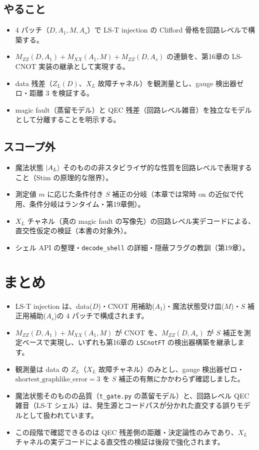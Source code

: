 \subsection{やること}

\begin{itemize}
  \item 4 パッチ（$D,A_1,M,A_s$）で LS-T injection の Clifford 骨格を回路レベルで構築する。
  \item $M_{ZZ}(D,A_1)+M_{XX}(A_1,M)+M_{ZZ}(D,A_s)$ の連鎖を、第16章の LS-CNOT 実装の継承として実現する。
  \item data 残差（$Z_L(D)$、$X_L$ 故障チャネル）を観測量とし、gauge 検出器ゼロ・距離 3 を検証する。
  \item magic fault（蒸留モデル）と QEC 残差（回路レベル雑音）を独立なモデルとして分離することを明示する。
\end{itemize}

\subsection{スコープ外}

\begin{itemize}
  \item 魔法状態 $\ket{A_L}$ そのものの非スタビライザ的な性質を回路レベルで表現すること（Stim の原理的な限界）。
  \item 測定値 $m$ に応じた条件付き $S$ 補正の分岐（本章では常時 on の近似で代用、条件分岐はランタイム・第19章側）。
  \item $X_L$ チャネル（真の magic fault の写像先）の回路レベル実デコードによる、直交性仮定の検証（本書の対象外）。
  \item シェル API の整理・\texttt{decode\_shell} の詳細・隠蔽フラグの教訓（第19章）。
\end{itemize}

\section{まとめ}\label{ch18:summary}

\begin{itemize}
  \item LS-T injection は、data($D$)・CNOT 用補助($A_1$)・魔法状態受け皿($M$)・$S$ 補正用補助($A_s$)の 4 パッチで構成されます。
  \item $M_{ZZ}(D,A_1)+M_{XX}(A_1,M)$ が CNOT を、$M_{ZZ}(D,A_s)$ が $S$ 補正を測定ベースで実現し、いずれも第16章の \texttt{LSCnotFT} の検出器構築を継承します。
  \item 観測量は data の $Z_L$（$X_L$ 故障チャネル）のみとし、gauge 検出器ゼロ・$\mathrm{shortest\_graphlike\_error}=3$ を $S$ 補正の有無にかかわらず確認しました。
  \item 魔法状態そのものの品質（\texttt{t\_gate.py} の蒸留モデル）と、回路レベル QEC 雑音（LS-T シェル）は、発生源とコードパスが分かれた直交する誤りモデルとして扱われています。
  \item この段階で確認できるのは QEC 残差側の距離・決定論性のみであり、$X_L$ チャネルの実デコードによる直交性の検証は後段で強化されます。
\end{itemize}

